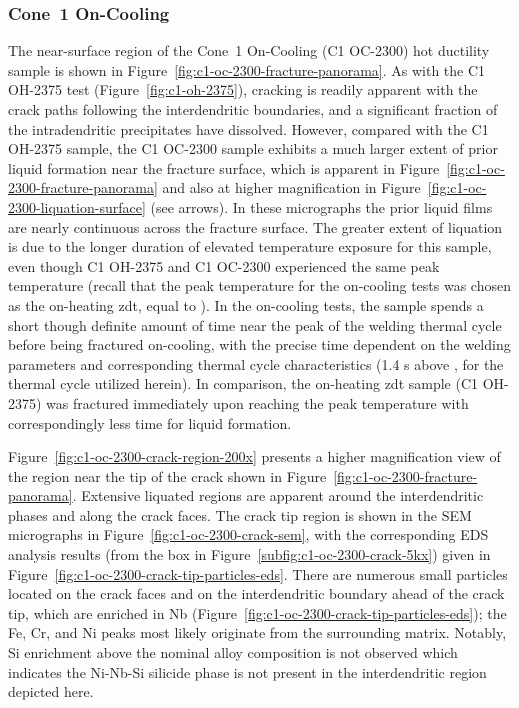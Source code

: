 {\subsubsection{Cone~1 On-Cooling}
The near-surface region of the Cone~1 On-Cooling  (C1 OC-2300) hot ductility sample is shown in Figure~\ref{fig:c1-oc-2300-fracture-panorama}. As with the C1 OH-2375 test (Figure~\ref{fig:c1-oh-2375}), cracking is readily apparent with the crack paths following the interdendritic boundaries, and a significant fraction of the intradendritic precipitates have dissolved. However, compared with the C1 OH-2375 sample, the C1 OC-2300 sample exhibits a much larger extent of prior liquid formation near the fracture surface, which is apparent in Figure~\ref{fig:c1-oc-2300-fracture-panorama} and also at higher magnification in Figure~\ref{fig:c1-oc-2300-liquation-surface} (see arrows). In these micrographs the prior liquid films are nearly continuous across the fracture surface. The greater extent of liquation is due to the longer duration of elevated temperature exposure for this sample, even though C1 OH-2375 and C1 OC-2300 experienced the same peak temperature (recall that the peak temperature for the on-cooling tests was chosen as the on-heating \gls{zdt}, equal to ). In the on-cooling tests, the sample spends a short though definite amount of time near the peak of the welding thermal cycle before being fractured on-cooling, with the precise time dependent on the welding parameters and corresponding thermal cycle characteristics (1.4 s above , for the thermal cycle utilized herein). In comparison, the on-heating \gls{zdt} sample (C1 OH-2375) was fractured immediately upon reaching the peak temperature with correspondingly less time for liquid formation.

Figure~\ref{fig:c1-oc-2300-crack-region-200x} presents a higher magnification view of the region near the tip of the crack shown in Figure~\ref{fig:c1-oc-2300-fracture-panorama}. Extensive liquated regions are apparent around the interdendritic phases and along the crack faces. The crack tip region is shown in the SEM micrographs in Figure~\ref{fig:c1-oc-2300-crack-sem}, with the corresponding EDS analysis results (from the box in Figure~\ref{subfig:c1-oc-2300-crack-5kx}) given in Figure~\ref{fig:c1-oc-2300-crack-tip-particles-eds}. There are numerous small particles located on the crack faces and on the interdendritic boundary ahead of the crack tip, which are enriched in Nb (Figure~\ref{fig:c1-oc-2300-crack-tip-particles-eds}); the Fe, Cr, and Ni peaks most likely originate from the surrounding matrix. Notably, Si enrichment above the nominal alloy composition is not observed which indicates the Ni-Nb-Si silicide phase is not present in the interdendritic region depicted here. 

}
